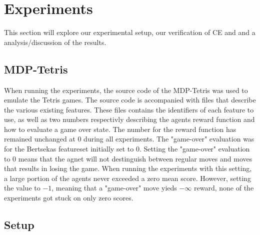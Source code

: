 \section{Experiments}

This section will explore our experimental setup, our verification of CE and 
and a analysis/discussion of the results.

\subsection{MDP-Tetris}

When running the experiments, the source code of the MDP-Tetris
\citep{mdptetris} was used to emulate the Tetris games.
The source code is accompanied with files that describe the
various existing features. These files contains the identifiers of 
each feature to use, as well as two numbers respectivly describing 
the agents reward function and how to evaluate a game over state. 
The number for the reward function has remained unchanged at $0$ 
during all experiments. The "game-over" evaluation was for the
Bertsekas featureset initially set to $0$. Setting the 
"game-over" evaluation to $0$ means that the agnet will not 
destinguish between regular moves and moves that results in losing
the game. When running the experiments with this setting, a large portion
of the agents never exceeded a zero mean score. However, setting the value
to $-1$, meaning that a "game-over" move yieds $-\infty$ reward, 
none of the experiments got stuck on only zero scores.

\subsection{Setup}


